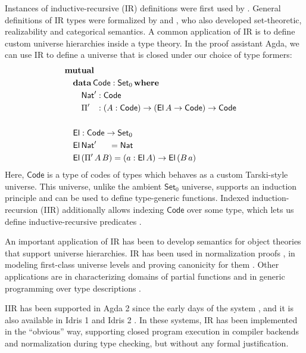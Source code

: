 \documentclass[acmsmall,screen,review,anonymous]{acmart}
\newcommand{\msf}[1]{{\mathsf{#1}}}
\newcommand{\mbf}[1]{{\mathbf{#1}}}
\newcommand{\data}{\mbf{data}}
\newcommand{\Set}{\msf{Set}}
\newcommand{\where}{\mbf{where}}
\newcommand{\Nat}{\msf{Nat}}
\newcommand{\El}{\msf{El}}
\newcommand{\Code}{\msf{Code}}
\begin{document}
Instances of inductive-recursive (IR) definitions were first used by
\citet{martin1975intuitionistic,martinlof84sambin}. General definitions of IR types were formalized
by \citet{DBLP:journals/jsyml/Dybjer00} and
\citet{dybjer99finite,DBLP:journals/jlp/DybjerS06,DBLP:journals/apal/DybjerS03}, who also developed
set-theoretic, realizability and categorical semantics. A common application of IR is to define
custom universe hierarchies inside a type theory. In the proof assistant Agda, we can use IR to
define a universe that is closed under our choice of type formers:
\begin{alignat*}{3}
  & \mbf{mutual} \\
  & \quad\data\,\Code : \Set_0\,\where \\
  & \quad\quad \Nat' : \Code\\
  & \quad\quad \Pi' \hspace{0.8em} : (A : \Code) \to (\El\,A \to \Code) \to \Code
  & \\
  & \\
  & \quad\El : \Code \to \Set_0 \\
  & \quad\El\,\Nat'\hspace{1.5em}  = \Nat \\
  & \quad\El\,(\Pi'\,A\,B) = (a : \El\,A) \to \El\,(B\,a)
\end{alignat*}
Here, $\Code$ is a type of codes of types which behaves as a custom Tarski-style universe. This
universe, unlike the ambient $\Set_0$ universe, supports an induction principle and can be used to
define type-generic functions. Indexed induction-recursion (IIR) additionally allows indexing
$\Code$ over some type, which lets us define inductive-recursive predicates \cite{DBLP:journals/jlp/DybjerS06}.

An important application of IR has been to develop semantics for object theories that support
universe hierarchies. IR has been used in normalization proofs
\cite{DBLP:journals/pacmpl/0001OV18,DBLP:journals/pacmpl/PujetT23,DBLP:journals/pacmpl/AbelDE23}, in
modeling first-class universe levels \cite{first-class-univ} and proving canonicity for them
\cite{DBLP:journals/corr/abs-2502-20485}. Other applications are in characterizing domains of
partial functions \cite{DBLP:conf/tphol/BoveC01} and in generic programming over type
descriptions \cite{diehl2017fully}.

IIR has been supported in Agda 2 since the early days of the system \cite{DBLP:conf/tphol/BoveDN09},
and it is also available in Idris 1 \cite{DBLP:journals/jfp/Brady13} and Idris 2
\cite{DBLP:conf/ecoop/Brady21}. In these systems, IR has been implemented in the ``obvious'' way,
supporting closed program execution in compiler backends and normalization during type checking, but
without any formal justification.
\end{document}
